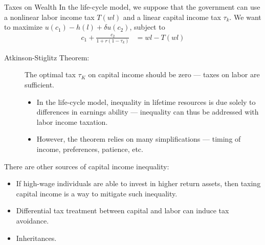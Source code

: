 \documentclass[10pt]{extarticle}
\begin{document}
  \begin{problem}{Taxes on Wealth}
    In the life-cycle model, we suppose that the government can use a nonlinear labor income tax $T(wl)$ and a linear capital income tax $\tau_k$. We want to maximize $u(c_1) - h(l) + \delta u(c_2)$, subject to
    \begin{align*}
      c_1 + \frac{c_2}{1 + r(1-\tau_k)} &= wl - T(wl)
    \end{align*}
    \begin{description}
      \item[Atkinson-Stiglitz Theorem:] The optimal tax $\tau_K$ on capital income should be zero --- taxes on labor are sufficient.
        \begin{itemize}
          \item In the life-cycle model, inequality in lifetime resources is due solely to differences in earnings ability --- inequality can thus be addressed with labor income taxation.
          \item However, the theorem relies on many simplifications --- timing of income, preferences, patience, etc.
        \end{itemize}
    \end{description}
    There are other sources of capital income inequality:
    \begin{itemize}
      \item If high-wage individuals are able to invest in higher return assets, then taxing capital income is a way to mitigate such inequality.
      \item Differential tax treatment between capital and labor can induce tax avoidance.
      \item Inheritances.
    \end{itemize}
  \end{problem}
\end{document}

